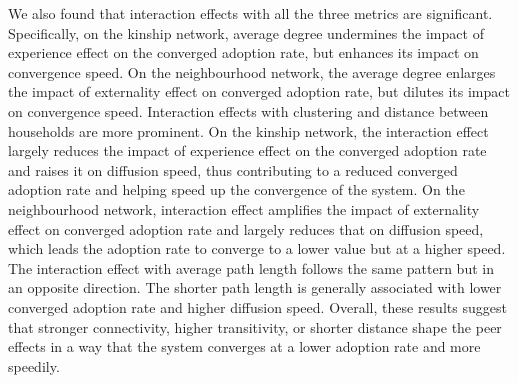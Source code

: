 \documentclass{bmcart}
\begin{document}
\begin{table}
\begin{center}
\caption{Peer Effects and Average Path Length (Negative Externality Effect)}
\label{Tab: reg peer effects average path length neg}
\end{center}
\end{table}

We also found that interaction effects with all the three metrics are significant. Specifically, on the kinship network, average degree undermines the impact of experience effect on the converged adoption rate, but enhances its impact on convergence speed. On the neighbourhood network, the average degree enlarges the impact of externality effect on converged adoption rate, but dilutes its impact on convergence speed. Interaction effects with clustering and distance between households are more prominent. On the kinship network, the interaction effect largely reduces the impact of experience effect on the converged adoption rate and raises it on diffusion speed, thus contributing to a reduced converged adoption rate and helping speed up the convergence of the system. On the neighbourhood network, interaction effect amplifies the impact of externality effect on converged adoption rate and largely reduces that on diffusion speed, which leads the adoption rate to converge to a lower value but at a higher speed. The interaction effect with average path length follows the same pattern but in an opposite direction. The shorter path length is generally associated with lower converged adoption rate and higher diffusion speed. Overall, these results suggest that stronger connectivity, higher transitivity, or shorter distance shape the peer effects in a way that the system converges at a lower adoption rate and more speedily.
\end{document}
